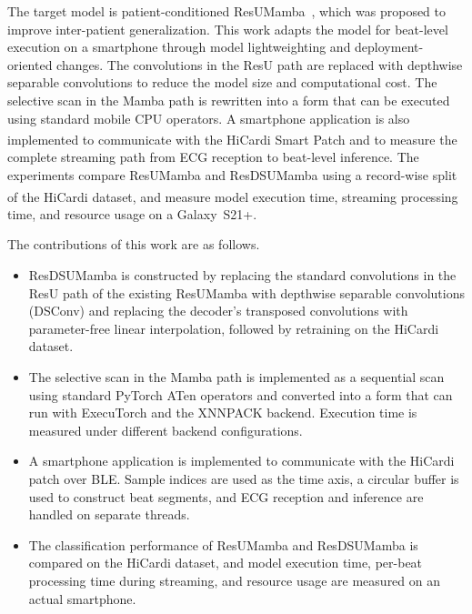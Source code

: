 The target model is patient-conditioned ResUMamba~\cite{heo2026resumamba}, which was proposed to improve inter-patient generalization.
This work adapts the model for beat-level execution on a smartphone through model lightweighting and deployment-oriented changes.
The convolutions in the ResU path are replaced with depthwise separable convolutions to reduce the model size and computational cost.
The selective scan in the Mamba path is rewritten into a form that can be executed using standard mobile CPU operators.
A smartphone application is also implemented to communicate with the HiCardi\textsuperscript{\textregistered} Smart Patch and to measure the complete streaming path from ECG reception to beat-level inference.
The experiments compare ResUMamba and ResDSUMamba using a record-wise split of the HiCardi\textsuperscript{\textregistered} dataset, and measure model execution time, streaming processing time, and resource usage on a Galaxy~S21+.

The contributions of this work are as follows.
\begin{itemize}
\item ResDSUMamba is constructed by replacing the standard convolutions in the ResU path of the existing ResUMamba with depthwise separable convolutions (DSConv) and replacing the decoder's transposed convolutions with parameter-free linear interpolation, followed by retraining on the HiCardi dataset.
\item The selective scan in the Mamba path is implemented as a sequential scan using standard PyTorch ATen operators and converted into a form that can run with ExecuTorch and the XNNPACK backend. Execution time is measured under different backend configurations.
\item A smartphone application is implemented to communicate with the HiCardi patch over BLE. Sample indices are used as the time axis, a circular buffer is used to construct beat segments, and ECG reception and inference are handled on separate threads.
\item The classification performance of ResUMamba and ResDSUMamba is compared on the HiCardi dataset, and model execution time, per-beat processing time during streaming, and resource usage are measured on an actual smartphone.
\end{itemize}


\clearpage

